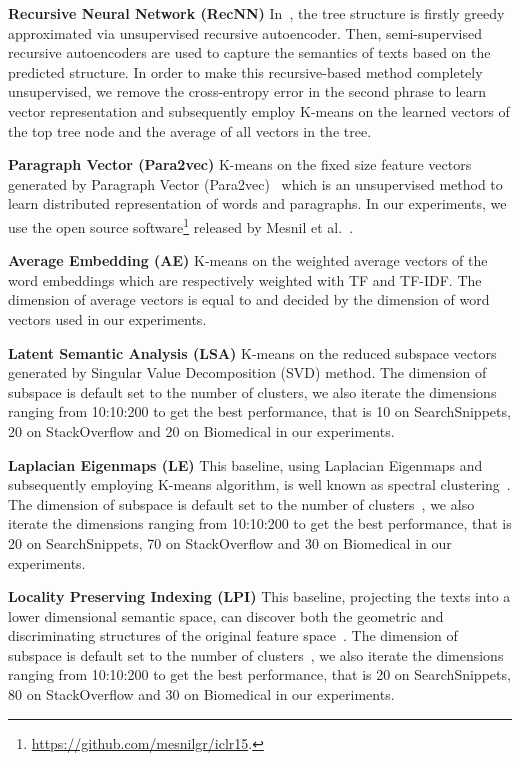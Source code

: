 \documentclass[review]{elsarticle}
\begin{document}
 {\bf{Recursive Neural Network (RecNN)}} In~\cite{24_socher2011semi}, the tree structure is firstly greedy approximated via unsupervised recursive autoencoder. Then, semi-supervised recursive autoencoders are used to capture the semantics of texts based on the predicted structure. In order to make this recursive-based method completely unsupervised, we remove the cross-entropy error in the second phrase to learn vector representation and subsequently employ K-means on the learned vectors of the top tree node and the average of all vectors in the tree.

 {\bf{Paragraph Vector (Para2vec)}} K-means on the fixed size feature vectors generated by Paragraph Vector (Para2vec)~\cite{le2014distributed} which is an unsupervised method to learn distributed representation of words and paragraphs. In our experiments, we use the open source software\footnote{\url{https://github.com/mesnilgr/iclr15}.} released by Mesnil et al.~\cite{mesnil2014ensemble}.

 {\bf{Average Embedding (AE)}} K-means on the weighted average vectors of the word embeddings which are respectively weighted with TF and TF-IDF. The dimension of average vectors is equal to and decided by the dimension of word vectors used in our experiments.

 {\bf{Latent Semantic Analysis (LSA)}} K-means on the reduced subspace vectors generated by Singular Value Decomposition (SVD) method. The dimension of subspace is default set to the number of clusters, we also iterate the dimensions ranging from 10:10:200 to get the best performance, that is 10 on SearchSnippets, 20 on StackOverflow and 20 on Biomedical in our experiments.


 {\bf{Laplacian Eigenmaps (LE)}} This baseline, using Laplacian Eigenmaps and subsequently employing K-means algorithm, is well known as spectral clustering~\cite{12_belkin2001laplacian}. The dimension of subspace is default set to the number of clusters~\cite{37_ng2002spectral,4_cai2005document}, we also iterate the dimensions ranging from 10:10:200 to get the best performance, that is 20 on SearchSnippets, 70 on StackOverflow and 30 on Biomedical in our experiments.

 {\bf{Locality Preserving Indexing (LPI)}} This baseline, projecting the texts into a lower dimensional semantic space, can discover both the geometric and discriminating structures of the original feature space~\cite{4_cai2005document}. The dimension of subspace is default set to the number of clusters~\cite{4_cai2005document}, we also iterate the dimensions ranging from 10:10:200 to get the best performance, that is 20 on SearchSnippets, 80 on StackOverflow and 30 on Biomedical in our experiments.
\end{document}
